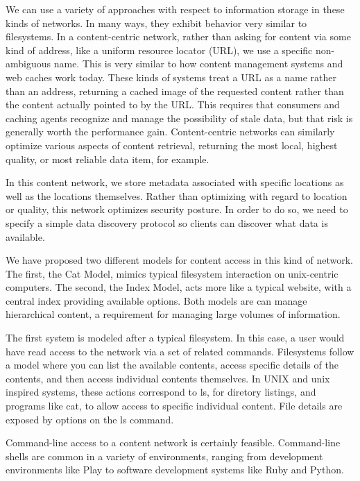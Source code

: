 We can use a variety of approaches with respect to information storage in these kinds of networks.  In many ways, they exhibit behavior very similar to filesystems.  In a content-centric network, rather than asking for content via some kind of address, like a uniform resource locator (URL), we use a specific non-ambiguous name.  This is very similar to how content management systems and web caches work today.  These kinds of systems treat a URL as a name rather than an address, returning a cached image of the requested content rather than the content actually pointed to by the URL.  This requires that consumers and caching agents recognize and manage the possibility of stale data, but that risk is generally worth the performance gain.  Content-centric networks can similarly optimize various aspects of content retrieval, returning the most local, highest quality, or most reliable data item, for example.

In this content network, we store metadata associated with specific locations as well as the locations themselves.  Rather than optimizing with regard to location or quality, this network optimizes security posture.  In order to do so, we need to specify a simple data discovery protocol so clients can discover what data is available.

We have proposed two different models for content access in this kind of network.  The first, the Cat Model, mimics typical filesystem interaction on unix-centric computers.  The second, the Index Model, acts more like a typical website, with a central index providing available options.  Both models are can manage hierarchical content, a requirement for managing large volumes of information.

The first system is modeled after a typical filesystem.  In this case, a user would have read access to the network via a set of related commands.  Filesystems follow a model where you can list the available contents, access specific details of the contents, and then access individual contents themselves.  In UNIX and unix inspired systems, these actions correspond to ls, for diretory listings, and programs like cat, to allow access to specific individual content.  File details are exposed by options on the ls command.

Command-line access to a content network is certainly feasible.  Command-line shells are common in a variety of environments, ranging from development environments like Play to software development systems like Ruby and Python.

